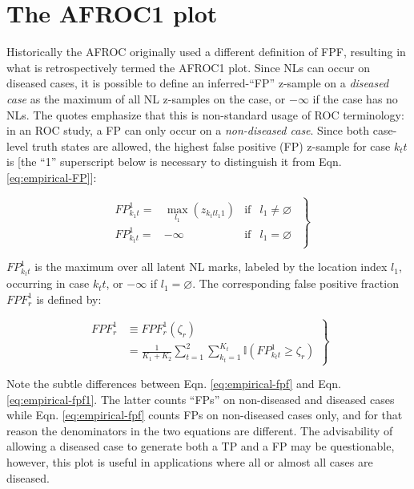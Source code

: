 \documentclass[
]{book}
\begin{document}
\hypertarget{empirical-AFROC1}{%
\section{The AFROC1 plot}\label{empirical-AFROC1}}

Historically the AFROC originally used a different definition of FPF, resulting in what is retrospectively termed the AFROC1 plot. Since NLs can occur on diseased cases, it is possible to define an inferred-``FP'' z-sample on a \emph{diseased case} as the maximum of all NL z-samples on the case, or \(-\infty\) if the case has no NLs. The quotes emphasize that this is non-standard usage of ROC terminology: in an ROC study, a FP can only occur on a \emph{non-diseased case}. Since both case-level truth states are allowed, the highest false positive (FP) z-sample for case \(k_t t\) is {[}the ``1'' superscript below is necessary to distinguish it from Eqn. \eqref{eq:empirical-FP}{]}:

\begin{equation}
\left.
\begin{aligned}
\begin{matrix}
FP_{k_1 t}^1=&\max_{l_1} \left ( z_{k_t t l_1 1 } \right ) & \text{if} & l_1 \neq \varnothing\\
FP_{k_t t}^1=&-\infty & \text{if} & l_1 = \varnothing
\end{matrix}
\end{aligned}
\right \}
\label{eq:empirical-FP1}
\end{equation}

\(FP_{k_t t}^1\) is the maximum over all latent NL marks, labeled by the location index \(l_1\), occurring in case \(k_t t\), or \(-\infty\) if \(l_1 = \varnothing\). The corresponding false positive fraction \(FPF_r^1\) is defined by:

\begin{equation}
\left.
\begin{aligned}
FPF_r^1 
&\equiv FPF_r^1\left ( \zeta_r \right ) \\
&= \frac{1}{K_1+K_2}\sum_{t=1}^{2}\sum_{k_t=1}^{K_t} \mathbb{I}\left ( FP_{k_t t}^1 \geq \zeta_r \right )
\end{aligned}
\right \}
\label{eq:empirical-fpf1}
\end{equation}

Note the subtle differences between Eqn. \eqref{eq:empirical-fpf} and Eqn. \eqref{eq:empirical-fpf1}. The latter counts ``FPs'' on non-diseased and diseased cases while Eqn. \eqref{eq:empirical-fpf} counts FPs on non-diseased cases only, and for that reason the denominators in the two equations are different. The advisability of allowing a diseased case to generate both a TP and a FP may be questionable, however, this plot is useful in applications where all or almost all cases are diseased.
\end{document}
